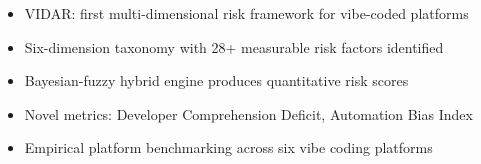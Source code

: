 
\begin{itemize}
\item VIDAR: first multi-dimensional risk framework for vibe-coded platforms
\item Six-dimension taxonomy with 28+ measurable risk factors identified
\item Bayesian-fuzzy hybrid engine produces quantitative risk scores
\item Novel metrics: Developer Comprehension Deficit, Automation Bias Index
\item Empirical platform benchmarking across six vibe coding platforms
\end{itemize}
